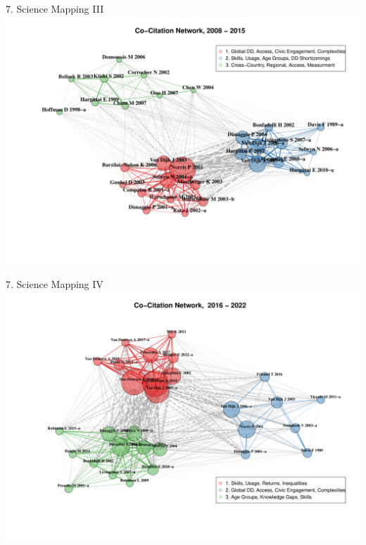 \documentclass[
  ignorenonframetext,
]{beamer}
\begin{document}
\begin{frame}{7. Science Mapping III}
\protect\hypertarget{science-mapping-iii}{}
\includegraphics{Presentation_bibliometric_Urbino_may_23_files/figure-beamer/Co_cite_P2-1.pdf}
\end{frame}

\begin{frame}{7. Science Mapping IV}
\protect\hypertarget{science-mapping-iv}{}
\includegraphics{Presentation_bibliometric_Urbino_may_23_files/figure-beamer/Co_cite_P3-1.pdf}
\end{frame}
\end{document}
